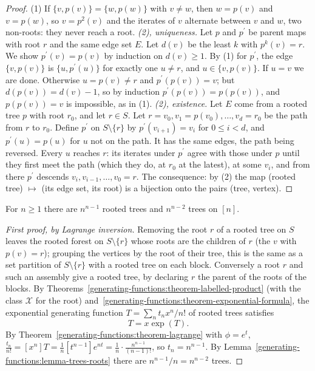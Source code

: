 \begin{proof}
(1) If $\{v, p(v)\} = \{w, p(w)\}$ with $v \neq w$, then $w = p(v)$ and $v = p(w)$, so $v = p^2(v)$ and the iterates of $v$ alternate between $v$ and $w$, two non-roots: they never reach a root.
\emph{(2), uniqueness.} Let $p$ and $p^{\prime}$ be parent maps with root $r$ and the same edge set $E$. Let $d(v)$ be the least $k$ with $p^k(v) = r$. We show $p^{\prime}(v) = p(v)$ by induction on
$d(v) \geq 1$. By (1) for $p^{\prime}$, the edge $\{v, p(v)\}$ is $\{u, p^{\prime}(u)\}$ for exactly one $u \neq r$, and $u \in \{v, p(v)\}$. If $u = v$ we are done. Otherwise $u = p(v) \neq r$ and
$p^{\prime}(p(v)) = v$; but $d(p(v)) = d(v) - 1$, so by induction $p^{\prime}(p(v)) = p(p(v))$, and $p(p(v)) = v$ is impossible, as in (1).
\emph{(2), existence.} Let $E$ come from a rooted tree $p$ with root $r_0$, and let $r \in S$. Let $r = v_0, v_1 = p(v_0), \ldots, v_d = r_0$ be the path from $r$ to $r_0$. Define $p^{\prime}$ on
$S \setminus \{r\}$ by $p^{\prime}(v_{i+1}) = v_i$ for $0 \leq i < d$, and $p^{\prime}(u) = p(u)$ for $u$ not on the path. It has the same edges, the path being reversed. Every $u$ reaches $r$: its
iterates under $p^{\prime}$ agree with those under $p$ until they first meet the path (which they do, at $r_0$ at the latest), at some $v_i$, and from there $p^{\prime}$ descends $v_i, v_{i-1}, \ldots, v_0 = r$.
The consequence: by (2) the map (rooted tree) $\mapsto$ (its edge set, its root) is a bijection onto the pairs (tree, vertex).
\end{proof}

\begin{theorem}\label{generating-functions:theorem-cayley}
For $n \geq 1$ there are $n^{n-1}$ rooted trees and $n^{n-2}$ trees on $[n]$.
\end{theorem}

\begin{proof}[First proof, by Lagrange inversion]
Removing the root $r$ of a rooted tree on $S$ leaves the rooted forest on $S \setminus \{r\}$ whose roots are the children of $r$ (the $v$ with $p(v) = r$); grouping the vertices by the root of their
tree, this is the same as a set partition of $S \setminus \{r\}$ with a rooted tree on each block. Conversely a root $r$ and such an assembly give a rooted tree, by declaring $r$ the parent of the
roots of the blocks. By Theorems~\ref{generating-functions:theorem-labelled-product} (with the class $\mathcal{X}$ for the root) and~\ref{generating-functions:theorem-exponential-formula}, the
exponential generating function $T = \sum_nt_nx^n/n!$ of rooted trees satisfies
\[
T = x\exp(T).
\]
By Theorem~\ref{generating-functions:theorem-lagrange} with $\phi = e^t$, $\frac{t_n}{n!} = [x^n]T = \frac{1}{n}[t^{n-1}]e^{nt} = \frac{1}{n}\cdot\frac{n^{n-1}}{(n - 1)!}$, so $t_n = n^{n-1}$. By
Lemma~\ref{generating-functions:lemma-trees-roots} there are $n^{n-1}/n = n^{n-2}$ trees.
\end{proof}

